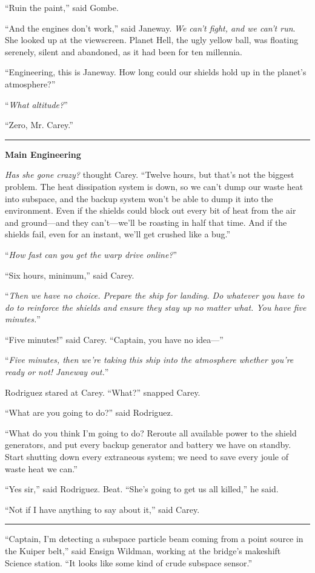 \documentclass[twoside,letterpaper,12pt]{memoir}
\begin{document}
``Ruin the paint,'' said Gombe.

``And the engines don't work,'' said Janeway. \textit{We can't fight, and we can't run}. She looked up at the viewscreen. Planet Hell, the ugly yellow ball, was floating serenely, silent and abandoned, as it had been for ten millennia.

``Engineering, this is Janeway. How long could our shields hold up in the planet's atmosphere?''

``\textit{What altitude?}''

``Zero, Mr. Carey.''

\fancybreak{\rule{3cm}{0.4 pt}}
\textbf{Main Engineering}

\textit{Has she gone crazy?} thought Carey. ``Twelve hours, but that's not the biggest problem. The heat dissipation system is down, so we can't dump our waste heat into subspace, and the backup system won't be able to dump it into the environment. Even if the shields could block out every bit of heat from the air and ground---and they can't---we'll be roasting in half that time. And if the shields fail, even for an instant, we'll get crushed like a bug.''

``\textit{How fast can you get the warp drive online?}''

``Six hours, minimum,'' said Carey.

``\textit{Then we have no choice. Prepare the ship for landing. Do whatever you have to do to reinforce the shields and ensure they stay up no matter what. You have five minutes.}''

``Five minutes!'' said Carey. ``Captain, you have no idea---''

``\textit{Five minutes, then we're taking this ship into the atmosphere whether you're ready or not! Janeway out.}''

Rodriguez stared at Carey. ``What?'' snapped Carey.

``What are you going to do?'' said Rodriguez.

``What do you think I'm going to do? Reroute all available power to the shield generators, and put every backup generator and battery we have on standby. Start shutting down every extraneous system; we need to save every joule of waste heat we can.''

``Yes sir,'' said Rodriguez. Beat. ``She's going to get us all killed,'' he said.

``Not if I have anything to say about it,'' said Carey.

\fancybreak{\rule{3cm}{0.4 pt}}
``Captain, I'm detecting a subspace particle beam coming from a point source in the Kuiper belt,'' said Ensign Wildman, working at the bridge's makeshift Science station. ``It looks like some kind of crude subspace sensor.''
\end{document}
